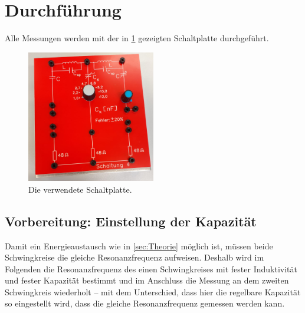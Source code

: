 \section{Durchführung}
\label{sec:Durchführung}
Alle Messungen werden mit der in \ref{fig:platte}
gezeigten Schaltplatte durchgeführt. 
\begin{figure}
    \centering
    \includegraphics[width=0.5\textwidth]{plots/Platte.jpeg}
    \caption{Die verwendete Schaltplatte.}
    \label{fig:platte}
\end{figure}
\FloatBarrier

\subsection{Vorbereitung: Einstellung der Kapazität}
Damit ein Energieaustausch wie in \ref{sec:Theorie} möglich ist, müssen beide Schwingkreise die gleiche Resonanzfrequenz 
aufweisen. 
Deshalb wird im Folgenden die Resonanzfrequenz des einen Schwingkreises mit fester Induktivität und fester Kapazität bestimmt 
und im Anschluss die Messung an dem zweiten Schwingkreis wiederholt -- mit dem Unterschied, dass hier die regelbare Kapazität so
eingestellt wird, dass die gleiche Resonanzfrequenz gemessen werden kann. 

